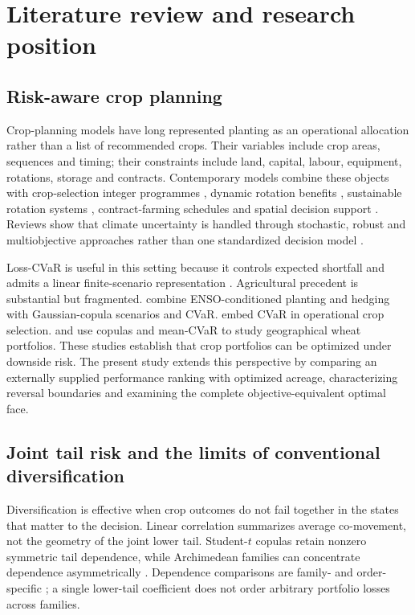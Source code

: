 \section{Literature review and research position}

\subsection{Risk-aware crop planning}

Crop-planning models have long represented planting as an operational
allocation rather than a list of recommended crops. Their variables include
crop areas, sequences and timing; their constraints include land, capital,
labour, equipment, rotations, storage and contracts. Contemporary models
combine these objects with crop-selection integer programmes
\citep{filippi2017mixed}, dynamic rotation benefits
\citep{boyabatli2019crop}, sustainable rotation systems
\citep{benini2023crop}, contract-farming schedules \citep{li2015contract} and
spatial decision support \citep{pahmeyer2021fruchtfolge}. Reviews show that
climate uncertainty is handled through stochastic, robust and multiobjective
approaches rather than one standardized decision model
\citep{randall2022robust,randall2024systematic}.

Loss-CVaR is useful in this setting because it controls expected shortfall and
admits a linear finite-scenario representation
\citep{rockafellar2000optimization,rockafellar2002conditional}. Agricultural
precedent is substantial but fragmented. \citet{aitsahlia2011enso} combine
ENSO-conditioned planting and hedging with Gaussian-copula scenarios and
CVaR. \citet{filippi2017mixed} embed CVaR in operational crop selection.
\citet{larsen2015geographical} and \citet{nguyenhuy2018copula} use copulas and
mean-CVaR to study geographical wheat portfolios. These studies establish
that crop portfolios can be optimized under downside risk. The present study
extends this perspective by comparing an externally supplied performance
ranking with optimized acreage, characterizing reversal boundaries and
examining the complete objective-equivalent optimal face.

\subsection{Joint tail risk and the limits of conventional diversification}

Diversification is effective when crop outcomes do not fail together in the
states that matter to the decision. Linear correlation summarizes average
co-movement, not the geometry of the joint lower tail. Student-\(t\) copulas
retain nonzero symmetric tail dependence, while Archimedean families can
concentrate dependence asymmetrically \citep{demarta2005tcopula}. Dependence
comparisons are family- and order-specific \citep{ansari2024dependence}; a
single lower-tail coefficient does not order arbitrary portfolio losses
across families.

